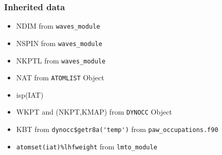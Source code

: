 \documentclass[11pt,a4paper]{report}
\begin{document}
\subsubsection{Inherited data}
\begin{itemize}
\item NDIM from \verb|waves_module|
\item NSPIN from \verb|waves_module|
\item NKPTL from \verb|waves_module|
\item NAT  from \verb|ATOMLIST| Object
\item isp(IAT)
\item WKPT and (NKPT,KMAP) from \verb|DYNOCC| Object
\item KBT from \verb|dynocc$getr8a('temp')| from
  \verb|paw_occupations.f90|
\item \verb|atomset(iat)%lhfweight| from \verb|lmto_module|
\end{itemize}

\end{document}

